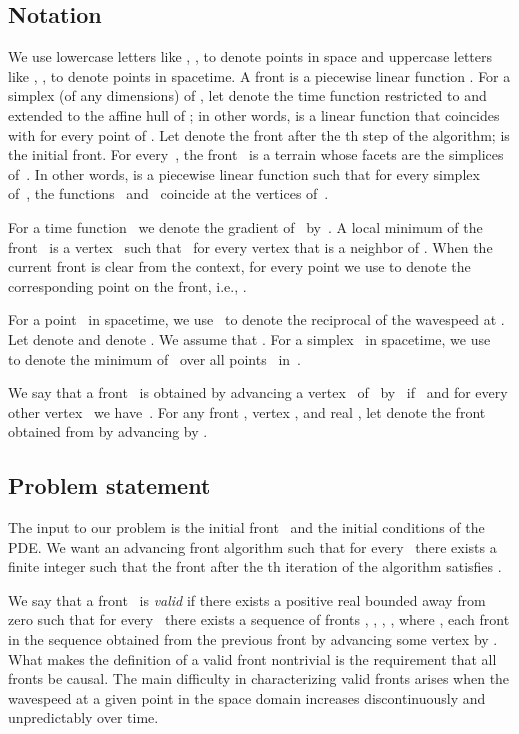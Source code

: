 \documentclass[twocolumn]{article}
\begin{document}
\subsection{Notation}

We use lowercase letters like , ,  to denote points in space
and uppercase letters like , ,  to denote points in
spacetime.  A front  is a piecewise linear function .  For a simplex (of any dimensions)  of , let
 denote the time function  restricted to  and
extended to the affine hull of ; in other words,
 is a linear function that coincides with  for
every point of .  Let  denote the front after
the th step of the algorithm;  is the initial front.  For
every~, the front~ is a terrain whose facets are the simplices
of~.  In other words,  is a piecewise linear function such
that for every simplex~ of~, the functions~
and~ coincide at the vertices of~.

For a time function~ we denote the gradient of~
by~.  A local minimum of the front~ is a vertex~ such
that~ for every vertex  that is a neighbor of .
When the current front  is clear from the context, for every point
 we use  to denote the corresponding point on the
front, i.e., .

For a point~ in spacetime, we use~ to denote the
reciprocal of the wavespeed at .  Let  denote  and  denote
.  We assume that .  For a simplex~ in spacetime, we
use~ to denote the minimum of~ over all
points~ in~.

We say that a front~ is obtained by advancing a vertex~ of~
by~ if~ and for every other vertex~ we have~.  For any front , vertex , and
real , let  denote the front obtained
from  by advancing  by .


\subsection{Problem statement}

The input to our problem is the initial front~ and the initial
conditions of the PDE.  We want an advancing front algorithm such that
for every~ there exists a finite integer 
such that the front  after the th iteration of the algorithm
satisfies .

We say that a front~ is \emph{valid} if there exists a positive
real  bounded away from zero such that for every~ there exists a sequence of fronts , , ,
,  where , each front in the sequence obtained
from the previous front by advancing some vertex by .  What
makes the definition of a valid front nontrivial is the requirement
that all fronts be causal.  The main difficulty in characterizing
valid fronts arises when the wavespeed at a given point in the space
domain increases discontinuously and unpredictably over time.
\end{document}

